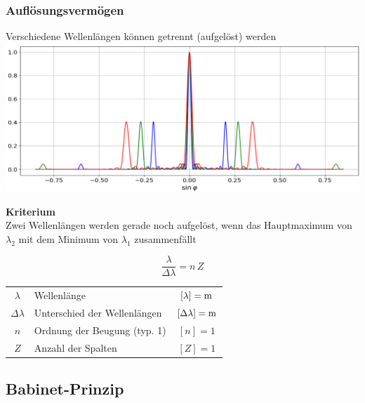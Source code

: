 

\subsubsection{Auflösungsvermögen}

Verschiedene Wellenlängen können getrennt (aufgelöst) werden \\


\includegraphics[width=0.9\linewidth]{Bilder/Wellen-Optik/aufloesungsvermoegen} \\

\vspace{0.2cm}

\textbf{Kriterium}\\

Zwei Wellenlängen werden gerade
noch aufgelöst, wenn das
Hauptmaximum von $\lambda_2$ mit dem Minimum von $\lambda_1$ zusammenfällt

$$ \boxed{ \frac{\lambda}{\Delta \lambda} = n \, Z } $$


\renewcommand{\arraystretch}{1.3}
\begin{tabular}{clc}
$\lambda$ & Wellenlänge & $[\lambda] = \mathrm{m}$ \\
$\Delta \lambda$ & Unterschied der Wellenlängen & $[ \Delta \lambda] = \mathrm{m}$ \\
$n$ & Ordnung der Beugung (typ. 1) & $[n] = 1$ \\
$Z$ & Anzahl der Spalten & $[Z] = 1$ 
\end{tabular}
\renewcommand{\arraystretch}{1}




\subsection{Babinet-Prinzip}

